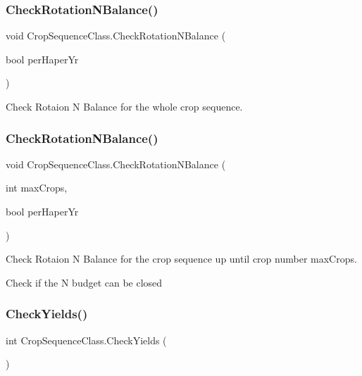 \subsubsection{\texorpdfstring{CheckRotationNBalance()}{CheckRotationNBalance()}\hspace{0.1cm}{\footnotesize\ttfamily [1/2]}}
{\footnotesize\ttfamily void Crop\+Sequence\+Class.\+Check\+Rotation\+N\+Balance (\begin{DoxyParamCaption}\item[{bool}]{per\+Haper\+Yr }\end{DoxyParamCaption})\hspace{0.3cm}{\ttfamily [inline]}}



Check Rotaion N Balance for the whole crop sequence. 

\mbox{\label{class_crop_sequence_class_aa078d5e9470d8f731d42275788fdf3d4}} 
\subsubsection{\texorpdfstring{CheckRotationNBalance()}{CheckRotationNBalance()}\hspace{0.1cm}{\footnotesize\ttfamily [2/2]}}
{\footnotesize\ttfamily void Crop\+Sequence\+Class.\+Check\+Rotation\+N\+Balance (\begin{DoxyParamCaption}\item[{int}]{max\+Crops,  }\item[{bool}]{per\+Haper\+Yr }\end{DoxyParamCaption})\hspace{0.3cm}{\ttfamily [inline]}}



Check Rotaion N Balance for the crop sequence up until crop number max\+Crops. 

Check if the N budget can be closed \mbox{\label{class_crop_sequence_class_a9367b587026218a44ff1806988f3ee65}} 
\subsubsection{\texorpdfstring{CheckYields()}{CheckYields()}}
{\footnotesize\ttfamily int Crop\+Sequence\+Class.\+Check\+Yields (\begin{DoxyParamCaption}{ }\end{DoxyParamCaption})\hspace{0.3cm}{\ttfamily [inline]}}



